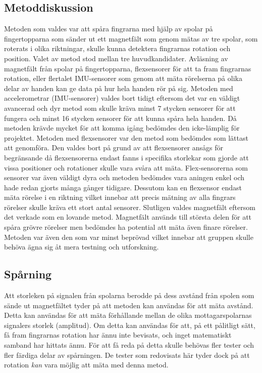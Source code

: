 \documentclass[a4paper]{article}
\makeatletter
\let\\\@raggedtwoe@savedcr%
\makeatother
\begin{document}
\begin{sloppypar}
    \subsection{Metoddiskussion}
    Metoden som valdes var att spåra fingrarna med hjälp av spolar på fingertopparna som
    sänder ut ett magnetfält som genom mätas av tre spolar, som roterats i olika riktningar, skulle kunna detektera fingrarnas rotation
    och position. Valet av metod stod mellan tre huvudkandidater. Avläsning av magnetfält
    från spolar på fingertopparna, flexsensorer för att ta fram fingrarnas rotation, eller
    flertalet IMU-sensorer som genom att mäta rörelserna på olika delar av handen kan
    ge data på hur hela handen rör på sig.
    \\\\
    Metoden med accelerometrar (IMU-sensorer) valdes bort tidigt eftersom det var en väldigt avancerad och
    dyr metod som skulle kräva minst 7 stycken sensorer för att fungera och minst 16 stycken
    sensorer för att kunna spåra hela handen. Då metoden krävde mycket för att komma
    igång bedömdes den icke-lämplig för projektet.
    \\\\
    Metoden med flexsensorer var den metod som bedömdes som lättast att genomföra. Den
    valdes bort på grund av att flexsensorer ansågs för begränsande då flexsensorerna
    endast fanns i specifika storlekar som gjorde att vissa positioner och rotationer
    skulle vara svåra att mäta. Flex-sensorerna som sensorer var även väldigt dyra och
    metoden bedömdes vara aningen enkel och hade redan gjorts många gånger tidigare.
    Dessutom kan en flexsensor endast mäta rörelse i en riktning vilket innebar att
    precis mätning av alla fingrars rörelser skulle kräva ett stort antal sensorer.
    \\\\
    Slutligen valdes magnetfält eftersom det verkade som en lovande metod. Magnetfält
    används till största delen för att spåra grövre rörelser men bedömdes ha potential
    att mäta även finare rörelser. Metoden var även den som var minst beprövad vilket
    innebar att gruppen skulle behöva ägna sig åt mera testning och utforskning.



    \subsection{Spårning}
    Att storleken på signalen från spolarna berodde på dess avstånd från spolen som sände ut magnetfältet tyder på att metoden kan användas för att mäta avstånd.
    Detta kan användas för att mäta förhållande mellan de olika mottagarspolarnas signalers storlek (amplitud).
    Om detta kan användas för att, på ett pålitligt sätt, få fram fingrarnas rotation har ännu inte bevisats, och inget matematiskt samband har hittats ännu.
    För att få reda på detta skulle behövas fler tester och fler färdiga delar av spårningen.
    De tester som redovisats här tyder dock på att rotation \textit{kan} vara möjlig att mäta med denna metod.


\end{sloppypar}
\end{document}
